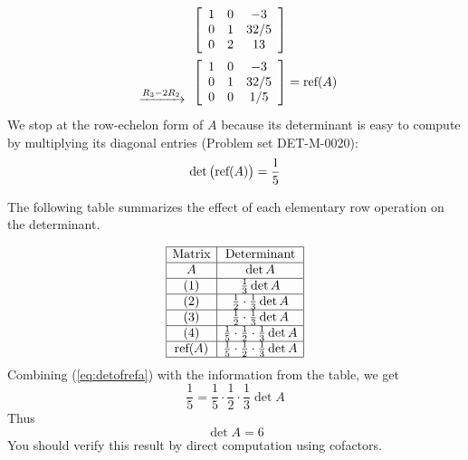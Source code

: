 \documentclass{ximera}
\begin{document}
\begin{example}
\begin{explanation}
\begin{align}
\begin{array}{c}
\end{array}
&\left[\begin{array}{ccc}  
 1&0&-3\\0&1&32/5\\0&2&13
 \end{array}\right]\label{eq:refstep4}\\
  \begin{array}{c}
  \\
\\
\xrightarrow{R_3-2R_2}\\
\end{array}&\left[\begin{array}{ccc}  
 1&0&-3\\0&1&32/5\\0&0&1/5
 \end{array}\right]=\textnormal{ref}(A)\nonumber
\end{align}
We stop at the row-echelon form of $A$ because its determinant is easy to compute by multiplying its diagonal entries ({\color{red}Problem set DET-M-0020}):
\begin{align}\label{eq:detofrefa}\det{\big(\textnormal{ref}(A)\big)}=\frac{1}{5}\end{align}

The following table summarizes the effect of each elementary row operation on the determinant.

$$\begin{array}{|c|c|}  
 \hline \text{Matrix}&\text{Determinant}\\ \hline A&  \det{A}\\ \hline (1) & \frac{1}{3}\det{A}\\
 \hline (2) &\frac{1}{2}\cdot\frac{1}{3}\det{A}\\
 \hline (3) &\frac{1}{2}\cdot\frac{1}{3}\det{A}\\
 \hline (4)&\frac{1}{5}\cdot\frac{1}{2}\cdot\frac{1}{3}\det{A}\\
 \hline \textnormal{ref}(A)& \frac{1}{5}\cdot\frac{1}{2}\cdot\frac{1}{3}\det{A} \\ \hline
 \end{array}$$
 Combining (\ref{eq:detofrefa}) with the information from the table, we get
 $$\frac{1}{5}=\frac{1}{5}\cdot\frac{1}{2}\cdot\frac{1}{3}\det{A}$$
 Thus
 $$\det{A}=6$$
 You should verify this result by direct computation using cofactors.
\end{explanation}
\end{example}
\end{document}
